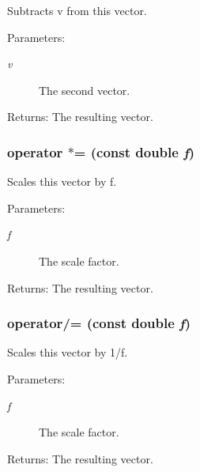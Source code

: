 Subtracts v from this vector. \begin{Desc}
\item[Parameters:]
\begin{description}
\item[{\em v}]The second vector. \end{description}
\end{Desc}
\begin{Desc}
\item[Returns:]The resulting vector. \end{Desc}
\subsubsection{ operator $\ast$= (const double {\em f})\hspace{0.3cm}{\tt  [inline]}}\label{classEngine_1_1Vector2_c313bdaa07cb31be3f02dcccaa107267}


Scales this vector by f. \begin{Desc}
\item[Parameters:]
\begin{description}
\item[{\em f}]The scale factor. \end{description}
\end{Desc}
\begin{Desc}
\item[Returns:]The resulting vector. \end{Desc}
\subsubsection{ operator/= (const double {\em f})\hspace{0.3cm}{\tt  [inline]}}\label{classEngine_1_1Vector2_aecd3cfb550d3bacecff55bb63dbae2d}


Scales this vector by 1/f. \begin{Desc}
\item[Parameters:]
\begin{description}
\item[{\em f}]The scale factor. \end{description}
\end{Desc}
\begin{Desc}
\item[Returns:]The resulting vector. \end{Desc}
